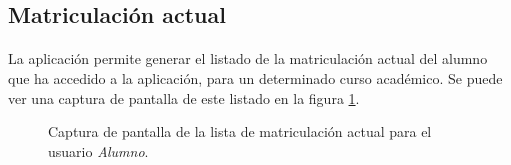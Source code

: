 \subsection{Matriculación actual}

  \paragraph{}La aplicación permite generar el listado de la matriculación
  actual del alumno que ha accedido a la aplicación, para un determinado curso
  académico. Se puede ver una captura de pantalla de este listado en la figura
  \ref{capturaPantallaMatriculacionActual}.

  \begin{figure}[!ht]
    \begin{center}
      \caption{Captura de pantalla de la lista de matriculación actual para el usuario \textit{Alumno}.}
      \label{capturaPantallaMatriculacionActual}
    \end{center}
  \end{figure}
